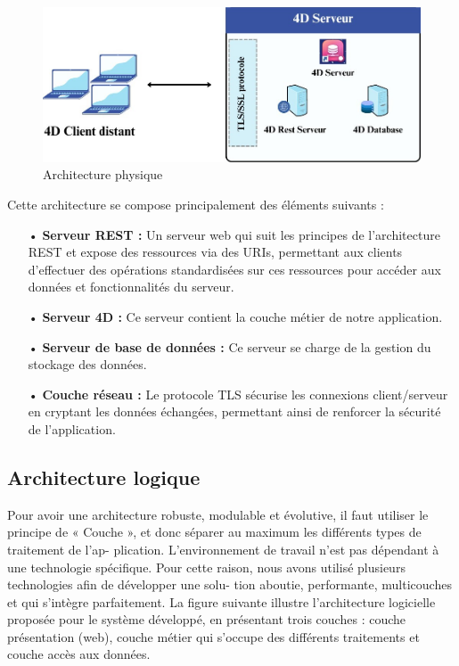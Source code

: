 \begin{figure}[htbp]
   \centering
   \includegraphics[scale=0.6]{Images/physique.jpg} %
   \caption{Architecture physique}
   \label{fig:physiqueArch}
\end{figure}

Cette architecture se compose principalement des éléments suivants :
\begin{itemize}
   \item[•] \textbf{Serveur REST :} Un serveur web qui suit les principes de l’architecture REST et expose des ressources via des URIs, permettant aux clients d’effectuer des opérations standardisées sur ces ressources pour accéder aux données et fonctionnalités du serveur.
   \item[•] \textbf{Serveur 4D :} Ce serveur contient la couche métier de notre application.
   \item[•] \textbf{Serveur de base de données :} Ce serveur se charge de la gestion du stockage des données.
   \item[•] \textbf{Couche réseau :} Le protocole TLS sécurise les connexions client/serveur en cryptant les données échangées, permettant ainsi de renforcer la sécurité de l'application.
\end{itemize}

\subsection{Architecture logique}
Pour avoir une architecture robuste, modulable et évolutive, il faut utiliser le principe de « Couche », et donc séparer au maximum les différents types de traitement de l’ap- plication. L’environnement de travail n’est pas dépendant à une technologie spécifique. Pour cette raison, nous avons utilisé plusieurs technologies afin de développer une solu- tion aboutie, performante, multicouches et qui s’intègre parfaitement. La figure suivante illustre l’architecture logicielle proposée pour le système développé, en présentant trois couches : couche présentation (web), couche métier qui s’occupe des différents traitements et couche accès aux données.

